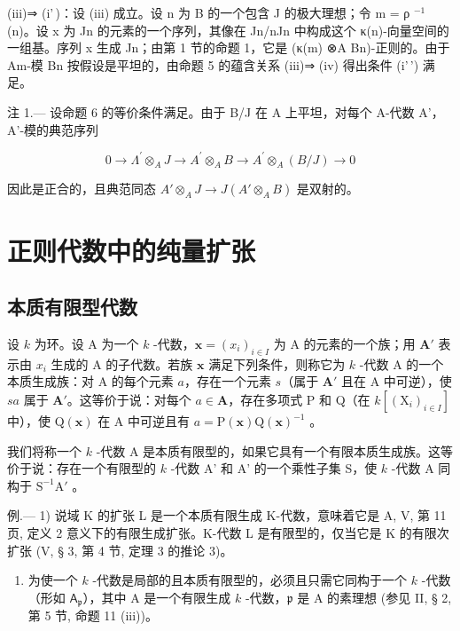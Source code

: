 (iii)⇒ (i'\,)：设 (iii) 成立。设 n 为 B 的一个包含 J 的极大理想；令 m = ρ \(^{-1}\) (n)。设 x 为 Jn 的元素的一个序列，其像在 Jn/nJn 中构成这个 κ(n)-向量空间的一组基。序列 x 生成 Jn；由第 1 节的命题 1，它是 (κ(m) ⊗A Bn)-正则的。由于 Am-模 Bn 按假设是平坦的，由命题 5 的蕴含关系 (iii)⇒ (iv) 得出条件 (i'\,') 满足。

注 1.--- 设命题 6 的等价条件满足。由于 B/J 在 A 上平坦，对每个 A-代数 A'，A'-模的典范序列

\[
0 \rightarrow \Lambda^ {\prime} \otimes_ {A} J \longrightarrow A ^ {\prime} \otimes_ {A} B \longrightarrow A ^ {\prime} \otimes_ {A} (B / J) \rightarrow 0
\]

因此是正合的，且典范同态 \(A'\otimes_A J \longrightarrow J(A'\otimes_A B)\) 是双射的。

\section{正则代数中的纯量扩张}

\subsection{本质有限型代数}

设 \(k\) 为环。设 A 为一个 \(k\) -代数，\(\mathbf{x} = (x_i)_{i \in I}\) 为 A 的元素的一个族；用 \(\mathbf{A}'\) 表示由 \(x_i\) 生成的 A 的子代数。若族 \(\mathbf{x}\) 满足下列条件，则称它为 \(k\) -代数 A 的一个本质生成族：对 A 的每个元素 \(a\)，存在一个元素 \(s\)（属于 \(\mathbf{A}'\) 且在 A 中可逆），使 \(sa\) 属于 \(\mathbf{A}'\)。这等价于说：对每个 \(a \in \mathbf{A}\)，存在多项式 P 和 Q（在 \(k[(\mathrm{X}_i)_{i \in I}]\) 中），使 \(\mathrm{Q}(\mathbf{x})\) 在 A 中可逆且有 \(a = \mathrm{P}(\mathbf{x})\mathrm{Q}(\mathbf{x})^{-1}\) 。

我们将称一个 \(k\) -代数 A 是本质有限型的，如果它具有一个有限本质生成族。这等价于说：存在一个有限型的 \(k\) -代数 A' 和 A' 的一个乘性子集 S，使 \(k\) -代数 A 同构于 \(\mathrm{S}^{-1}\mathrm{A}'\) 。

例.--- 1) 说域 K 的扩张 L 是一个本质有限生成 K-代数，意味着它是 A, V, 第 11 页, 定义 2 意义下的有限生成扩张。K-代数 L 是有限型的，仅当它是 K 的有限次扩张 (V, § 3, 第 4 节, 定理 3 的推论 3)。

\begin{enumerate}
\def\labelenumi{\arabic{enumi})}
\setcounter{enumi}{1}
\tightlist
\item
  为使一个 \(k\) -代数是局部的且本质有限型的，必须且只需它同构于一个 \(k\) -代数（形如 \(\mathsf{A}_{\mathfrak{p}}\)），其中 A 是一个有限生成 \(k\) -代数，\(\mathfrak{p}\) 是 A 的素理想 (参见 II, § 2, 第 5 节, 命题 11 (iii))。
\end{enumerate}

